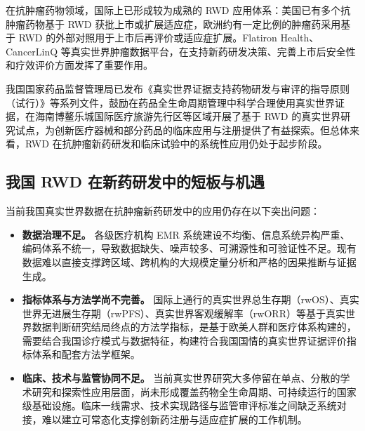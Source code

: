 \documentclass[12pt, a4paper, fontset=mac]{ctexart} %
\begin{document}
在抗肿瘤药物领域，国际上已形成较为成熟的 RWD 应用体系：美国已有多个抗肿瘤药物基于 RWD 获批上市或扩展适应症，欧洲约有一定比例的肿瘤药采用基于 RWD 的外部对照用于上市后再评价或适应症扩展\cite{arondekar_oncology_rwe,ECA-Oncology-Review,khozin2017_rwd_oncology,khozin_cancerj_2017,nice_rwd_2025}。Flatiron Health、CancerLinQ 等真实世界肿瘤数据平台，在支持新药研发决策、完善上市后安全性和疗效评价方面发挥了重要作用\cite{flatiron_overview,cancerlinq_overview,ma2020_flatiron_comparison,birnbaum2020_flatiron_cohort}。

我国国家药品监督管理局已发布《真实世界证据支持药物研发与审评的指导原则（试行）》等系列文件，鼓励在药品全生命周期管理中科学合理使用真实世界证据\cite{NMPA-RWE-Guideline,nmpa_rwd_device_2020}，在海南博鳌乐城国际医疗旅游先行区等区域开展了基于 RWD 的真实世界研究试点，为创新医疗器械和部分药品的临床应用与注册提供了有益探索\cite{boao_pilot_rwd,boao_rwd_commentary}。但总体来看，RWD 在抗肿瘤新药研发和临床试验中的系统性应用仍处于起步阶段。

\subsection{我国 RWD 在新药研发中的短板与机遇}

当前我国真实世界数据在抗肿瘤新药研发中的应用仍存在以下突出问题：

\begin{itemize}
  \item \textbf{数据治理不足。} 各级医疗机构 EMR 系统建设不均衡、信息系统异构严重、编码体系不统一，导致数据缺失、噪声较多、可溯源性和可验证性不足。现有数据难以直接支撑跨区域、跨机构的大规模定量分析和严格的因果推断与证据生成。
  \item \textbf{指标体系与方法学尚不完善。} 国际上通行的真实世界总生存期（rwOS）、真实世界无进展生存期（rwPFS）、真实世界客观缓解率（rwORR）等基于真实世界数据判断研究结局终点的方法学指标，是基于欧美人群和医疗体系构建的，需要结合我国诊疗模式与数据特征，构建符合我国国情的真实世界证据评价指标体系和配套方法学框架\cite{hernan_target_trial,makady2017_rwe_def,blonde2018_rwd_rwe,makady_htarwe_2017}。
  \item \textbf{临床、技术与监管协同不足。} 当前真实世界研究大多停留在单点、分散的学术研究和探索性应用层面，尚未形成覆盖药物全生命周期、可持续运行的国家级基础设施。临床一线需求、技术实现路径与监管审评标准之间缺乏系统对接，难以建立可常态化支撑创新药注册与适应症扩展的工作机制\cite{garrison_ispor_2007,berger_ispor_rwd_2017,costa_frontiers_rwe_2025}。
\end{itemize}
\end{document}
